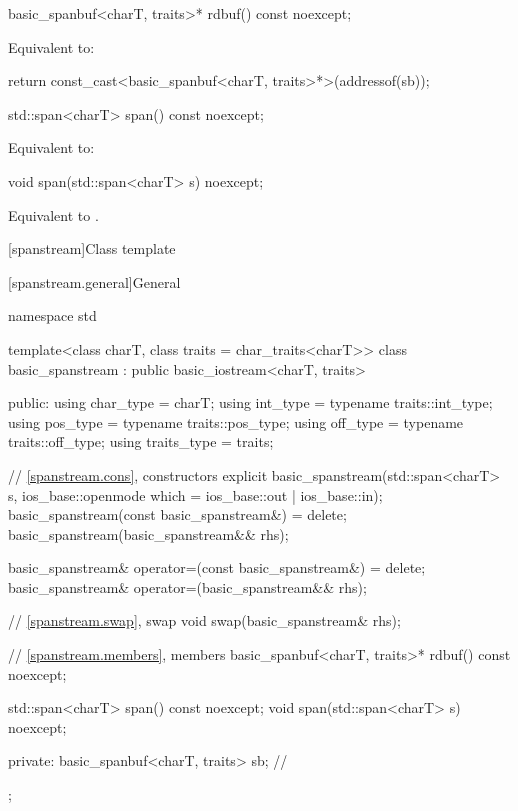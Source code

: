 %
\begin{itemdecl}
basic_spanbuf<charT, traits>* rdbuf() const noexcept;
\end{itemdecl}

\begin{itemdescr}
\pnum
\effects
Equivalent to:
\begin{codeblock}
return const_cast<basic_spanbuf<charT, traits>*>(addressof(sb));
\end{codeblock}
\end{itemdescr}

%
\begin{itemdecl}
std::span<charT> span() const noexcept;
\end{itemdecl}

\begin{itemdescr}
\pnum
\effects
Equivalent to: 
\end{itemdescr}

%
\begin{itemdecl}
void span(std::span<charT> s) noexcept;
\end{itemdecl}

\begin{itemdescr}
\pnum
\effects
Equivalent to .
\end{itemdescr}

[spanstream]{Class template }

[spanstream.general]{General}

%
\begin{codeblock}
namespace std {
  template<class charT, class traits = char_traits<charT>>
  class basic_spanstream
    : public basic_iostream<charT, traits> {
  public:
    using char_type   = charT;
    using int_type    = typename traits::int_type;
    using pos_type    = typename traits::pos_type;
    using off_type    = typename traits::off_type;
    using traits_type = traits;

    // \ref{spanstream.cons}, constructors
    explicit basic_spanstream(std::span<charT> s,
                              ios_base::openmode which = ios_base::out | ios_base::in);
    basic_spanstream(const basic_spanstream&) = delete;
    basic_spanstream(basic_spanstream&& rhs);

    basic_spanstream& operator=(const basic_spanstream&) = delete;
    basic_spanstream& operator=(basic_spanstream&& rhs);

    // \ref{spanstream.swap}, swap
    void swap(basic_spanstream& rhs);

    // \ref{spanstream.members}, members
    basic_spanbuf<charT, traits>* rdbuf() const noexcept;

    std::span<charT> span() const noexcept;
    void span(std::span<charT> s) noexcept;

  private:
    basic_spanbuf<charT, traits> sb;    // \expos
  };
}
\end{codeblock}

